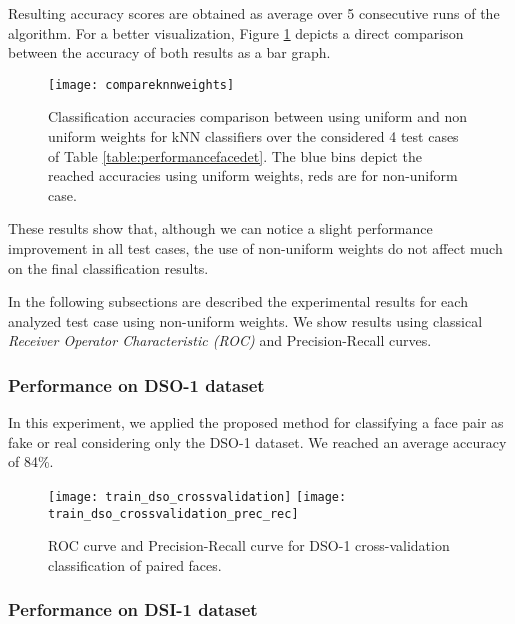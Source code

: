 Resulting accuracy scores are obtained as average over 5 consecutive runs of the algorithm. For a better visualization, Figure \ref{fig:compareknnweights} depicts a direct comparison between the accuracy of both results as a bar graph.

\begin{figure}[h!]
  \centering
    \texttt{[image: compareknnweights]}
    \caption{Classification accuracies comparison between using uniform and non uniform weights for kNN classifiers over the considered 4 test cases of Table \ref{table:performancefacedet}. The blue bins depict the reached accuracies using uniform weights, reds are for non-uniform case.}
    \label{fig:compareknnweights}
\end{figure}

These results show that, although we can notice a slight performance improvement in all test cases, the use of non-uniform weights do not affect much on the final classification results.

In the following subsections are described the experimental results for each analyzed test case using non-uniform weights. We show results using classical \emph{Receiver Operator Characteristic (ROC)} \cite{fawcett2006introduction} and Precision-Recall curves\cite{Davis:2006:RPR:1143844.1143874}. 

\subsubsection{Performance on DSO-1 dataset}

In this experiment, we applied the proposed method for classifying a face pair as fake or real considering only the DSO-1 dataset. We reached an average accuracy of 84\%.

\begin{figure}[!htb]
  \texttt{[image: train\_dso\_crossvalidation]}
\endminipage\hfill
{}
  \texttt{[image: train\_dso\_crossvalidation\_prec\_rec]}
\endminipage
\caption{ROC curve and Precision-Recall curve for DSO-1 cross-validation classification of paired faces.}\label{fig:regiondetnormal}
\end{figure}

\subsubsection{Performance on DSI-1 dataset}

